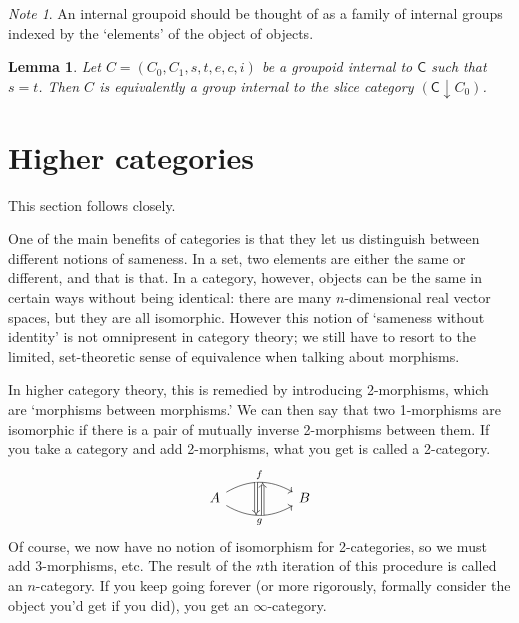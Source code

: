 \documentclass[a4paper,10pt]{scrreprt}
\theoremstyle{definition}
\theoremstyle{plain}
\newtheorem{lemma}{Lemma}[section]
\theoremstyle{remark}
\newtheorem{note}{Note}[section]
\begin{document}
\begin{note}
  An internal groupoid should be thought of as a family of internal groups indexed by the `elements' of the object of objects. 
\end{note}

\begin{lemma}
  \label{lemma:interalgroupoidsaregroupobjectsinslicecategory}
  Let $C = (C_{0}, C_{1}, s, t, e, c, i)$ be a groupoid internal to $\mathsf{C}$ such that $s = t$. Then $C$ is equivalently a group internal to the slice category $(\mathsf{C} \downarrow C_{0})$.
\end{lemma}

\section{Higher categories} \label{sec:highercategories}
This section follows \cite{baez-higher-categories} closely.

One of the main benefits of categories is that they let us distinguish between different notions of sameness. In a set, two elements are either the same or different, and that is that. In a category, however, objects can be the same in certain ways without being identical: there are many $n$-dimensional real vector spaces, but they are all isomorphic. However this notion of `sameness without identity' is not omnipresent in category theory; we still have to resort to the limited, set-theoretic sense of equivalence when talking about morphisms.

In higher category theory, this is remedied by introducing 2-morphisms, which are `morphisms between morphisms.' We can then say that two 1-morphisms are isomorphic if there is a pair of mutually inverse 2-morphisms between them. If you take a category and add 2-morphisms, what you get is called a 2-category.
\begin{equation*}
  \begin{tikzcd}[row sep=huge, column sep=huge]
    A 
    \arrow[r, bend left, "f", ""{name=UL, anchor=south east}, ""{name=UR, anchor=south west}]
    \arrow[r, swap, bend right, "g", ""{name=DL, anchor=north east}, ""{name=DR, anchor=north west}]
    \arrow[Rightarrow, from=UL , to=DL,] 
    \arrow[Leftarrow, from=UR , to=DR,] 
    & B
  \end{tikzcd}
\end{equation*}
Of course, we now have no notion of isomorphism for 2-categories, so we must add 3-morphisms, etc. The result of the $n$th iteration of this procedure is called an $n$-category. If you keep going forever (or more rigorously, formally consider the object you'd get if you did), you get an $\infty$-category.
\end{document}
